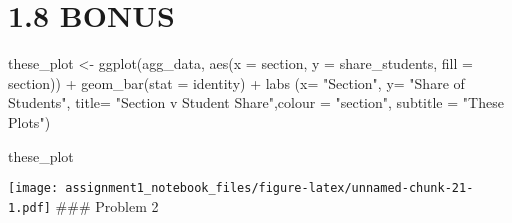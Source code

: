 \documentclass[
]{article}
\newenvironment{Shaded}{\begin{snugshade}}{\end{snugshade}}
\newcommand{\AttributeTok}[1]{\textcolor[rgb]{0.77,0.63,0.00}{#1}}
\newcommand{\CommentTok}[1]{\textcolor[rgb]{0.56,0.35,0.01}{\textit{#1}}}
\newcommand{\DecValTok}[1]{\textcolor[rgb]{0.00,0.00,0.81}{#1}}
\newcommand{\ErrorTok}[1]{\textcolor[rgb]{0.64,0.00,0.00}{\textbf{#1}}}
\newcommand{\FunctionTok}[1]{\textcolor[rgb]{0.00,0.00,0.00}{#1}}
\newcommand{\NormalTok}[1]{#1}
\newcommand{\OtherTok}[1]{\textcolor[rgb]{0.56,0.35,0.01}{#1}}
\newcommand{\SpecialCharTok}[1]{\textcolor[rgb]{0.00,0.00,0.00}{#1}}
\newcommand{\StringTok}[1]{\textcolor[rgb]{0.31,0.60,0.02}{#1}}
\begin{document}
\hypertarget{bonus}{%
\section{1.8 BONUS}\label{bonus}}

\begin{Shaded}
\begin{Highlighting}[]
\NormalTok{these\_plot }\OtherTok{\textless{}{-}} \FunctionTok{ggplot}\NormalTok{(agg\_data, }\FunctionTok{aes}\NormalTok{(}\AttributeTok{x =}\NormalTok{ section, }\AttributeTok{y =}\NormalTok{ share\_students, }\AttributeTok{fill =}\NormalTok{ section)) }\SpecialCharTok{+} 
  \FunctionTok{geom\_bar}\NormalTok{(}\AttributeTok{stat =} \StringTok{\textquotesingle{}identity\textquotesingle{}}\NormalTok{) }\SpecialCharTok{+}
  \FunctionTok{labs}\NormalTok{ (}\AttributeTok{x=} \StringTok{"Section"}\NormalTok{, }\AttributeTok{y=} \StringTok{"Share of Students"}\NormalTok{, }\AttributeTok{title=} \StringTok{"Section v Student Share"}\NormalTok{,}\AttributeTok{colour =} \StringTok{"section"}\NormalTok{, }\AttributeTok{subtitle =} \StringTok{"These Plots"}\NormalTok{)}

\NormalTok{these\_plot}
\end{Highlighting}
\end{Shaded}

\texttt{[image: assignment1\_notebook\_files/figure-latex/unnamed-chunk-21-1.pdf]}
\#\#\# Problem 2

\begin{Shaded}
\end{Shaded}
\end{document}
